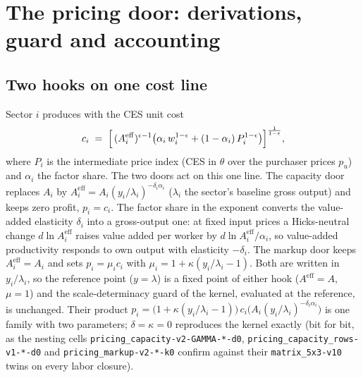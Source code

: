 \section{The pricing door: derivations, guard and accounting}\label{app:pricing-door}

\subsection{Two hooks on one cost line}\label{app:pricing-hooks}
Sector $i$ produces with the CES unit cost
\begin{equation}\label{eq:app-unit-cost}
  c_i \;=\; \Bigl[\,(A^{\mathrm{eff}}_i)^{\epsilon-1}\bigl(\alpha_i\,w_i^{1-\epsilon}
     + (1-\alpha_i)\,P_i^{1-\epsilon}\bigr)\Bigr]^{\frac{1}{1-\epsilon}},
\end{equation}
where $P_i$ is the intermediate price index (CES in $\theta$ over the
purchaser prices $p_u$) and $\alpha_i$ the factor share. The two doors act on
this one line. The capacity door replaces $A_i$ by
$A^{\mathrm{eff}}_i = A_i (y_i/\lambda_i)^{-\delta_i \alpha_i}$ ($\lambda_i$ the sector's baseline gross output) and keeps zero profit,
$p_i = c_i$. The factor share in the exponent converts the value-added
elasticity $\delta_i$ into a gross-output one: at fixed input prices a
Hicks-neutral change $d\ln A^{\mathrm{eff}}_i$ raises value added per worker by
$d\ln A^{\mathrm{eff}}_i/\alpha_i$, so value-added productivity responds to own
output with elasticity $-\delta_i$. The markup door keeps $A^{\mathrm{eff}}_i = A_i$ and sets
$p_i = \mu_i c_i$ with $\mu_i = 1 + \kappa(y_i/\lambda_i - 1)$. Both are
written in $y_i/\lambda_i$, so the reference point ($y = \lambda$) is a
fixed point of either hook ($A^{\mathrm{eff}} = A$, $\mu = 1$) and the
scale-determinacy guard of the kernel, evaluated at the reference, is
unchanged. Their product
$p_i = \bigl(1 + \kappa(y_i/\lambda_i - 1)\bigr)\,c_i\bigl(A_i (y_i/\lambda_i)^{-\delta_i\alpha_i}\bigr)$
is one family with two parameters; $\delta = \kappa = 0$ reproduces the
kernel exactly (bit for bit, as the nesting cells
\texttt{pricing\_capacity-v2-GAMMA-*-d0},
\texttt{pricing\_capacity\_rows-v1-*-d0} and
\texttt{pricing\_markup-v2-*-k0} confirm against their
\texttt{matrix\_5x3-v10} twins on every labor closure).

